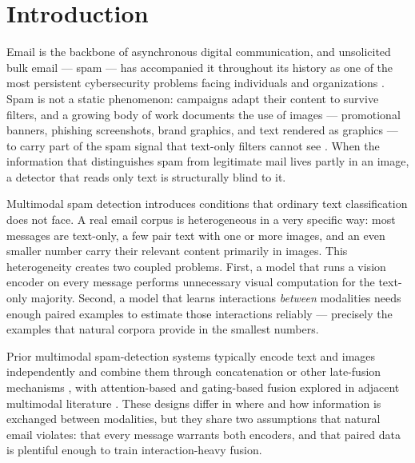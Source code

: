 \documentclass[10pt,twoside]{article}
\begin{document}
\section{Introduction}\label{sec:intro}

Email is the backbone of asynchronous digital communication, and unsolicited bulk email --- spam --- has accompanied it throughout its history as one of the most persistent cybersecurity problems facing individuals and organizations \citep{janez2023review}. Spam is not a static phenomenon: campaigns adapt their content to survive filters, and a growing body of work documents the use of images --- promotional banners, phishing screenshots, brand graphics, and text rendered as graphics --- to carry part of the spam signal that text-only filters cannot see \citep{annadatha2018image,kyaw2024phishing}. When the information that distinguishes spam from legitimate mail lives partly in an image, a detector that reads only text is structurally blind to it.

Multimodal spam detection introduces conditions that ordinary text classification does not face. A real email corpus is heterogeneous in a very specific way: most messages are text-only, a few pair text with one or more images, and an even smaller number carry their relevant content primarily in images. This heterogeneity creates two coupled problems. First, a model that runs a vision encoder on every message performs unnecessary visual computation for the text-only majority. Second, a model that learns interactions \emph{between} modalities needs enough paired examples to estimate those interactions reliably --- precisely the examples that natural corpora provide in the smallest numbers.

Prior multimodal spam-detection systems typically encode text and images independently and combine them through concatenation or other late-fusion mechanisms \citep{zhang2023mmtd}, with attention-based and gating-based fusion explored in adjacent multimodal literature \citep{lu2019vilbert}. These designs differ in where and how information is exchanged between modalities, but they share two assumptions that natural email violates: that every message warrants both encoders, and that paired data is plentiful enough to train interaction-heavy fusion.
\end{document}
